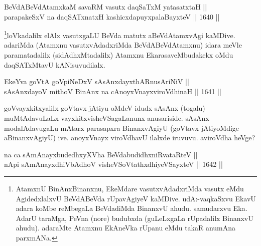 
\begin{shl}
BeVdABeVdAtamxkaM savaRM vasutx daqSaTxM yatasatxtaH ||  \\
parapakeSxV na daqSATxnatxH kashicxdapuyxpalaBayxteV \hfill || 1640 ||  
\end{shl}

\begin{artha}
\footnote{AtamxnU BinAnxBinanxnu, EkeMdare vasutxvAdadxriMda vasutx eMdu AgidedxlalxvU BeVdABeVda rUpavAgiyeV kaMDive. udA:-vaqkaSxvu EkavU adara koMbe reMbegaLa BeVdadiMda BinanxvU ahudu. samudarxvu Eka. AdarU taraMga, PeVna (nore) budubxda (guLeLxgaLa rUpadalilx BinanxvU ahudu). adaraMte Atamxnu EkAneVka rUpanu eMdu takaR anumAna parxmANa.}loVkadalilx elAlx vasutxgaLU BeVda matutx aBeVdAtamxvAgi kaMDive. adariMda (Atamxnu vasutxvAdadxriMda BeVdABeVdAtamxnu) idara meVle paramatadalilx (sidAdhxMtadalilx) Atamxnu EkarasaveMbudakekx oMdu daqSATxMtavU kANisuvudilalx.
\end{artha}


\begin{shl}
EkeYva goVtA goVpiNeDxV \footnotemark[1]sAsAnxdayxthARnusAriNiV || \\
sAsAnxdayoV mithoV BinAnx na cAnoyxVnayxviroVdhinaH \hfill || 1641 ||  
\end{shl}

\begin{artha}
goVvayxkitxyalilx goVtavx jAtiyu oMdeV idudx sAsAnx (togalu) muMtAdavuLaLx vayxkitxvisheVSagaLanunx anusariside. sAsAnx modalAdavugaLu mAtarx parasapxra BinanxvAgiyU (goVtavx jAtiyoMdige aBinanxvAgiyU) ive. anoyxVnayx viroVdhavU ilalxde iruvuvu. aviroVdha heVge?
\end{artha}

\begin{shl}
na ca sAmAnayxbudedhxyXVha BeVdabudidhxniRvataRteV || \\
nApi sAmAnayxdhiVbAdhoV visheVSoVtathxdhiyeVSayxteV \hfill || 1642 ||  
\end{shl}

